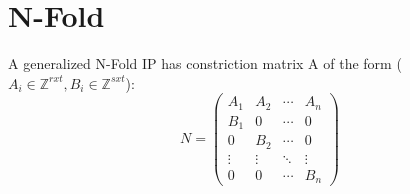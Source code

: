 \chapter{N-Fold} \label{methodology}



A generalized N-Fold IP has constriction matrix A of the form ($A_i \in \mathbb{Z}^{rxt}, B_i \in \mathbb{Z}^{sxt}$):\\
\begin{equation*}
N = 
\begin{pmatrix}
A_1 & A_2 & \cdots & A_n \\
B_1 & 0   & \cdots & 0 \\
0   & B_2 & \cdots & 0 \\
\vdots    & \vdots & \ddots & \vdots  \\
0   & 0   & \cdots & B_n 
\end{pmatrix}
\end{equation*}



